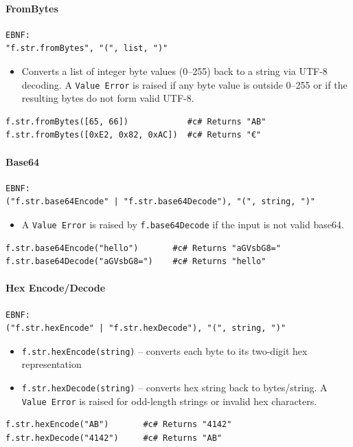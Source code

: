 \paragraph{FromBytes}
\begin{verbatim}
EBNF:
"f.str.fromBytes", "(", list, ")"
\end{verbatim}
\begin{itemize}
\item Converts a list of integer byte values (0--255) back to a string via UTF-8 decoding. A \texttt{Value Error} is raised if any byte value is outside 0--255 or if the resulting bytes do not form valid UTF-8.
\end{itemize}
\begin{verbatim}
f.str.fromBytes([65, 66])            #c# Returns "AB"
f.str.fromBytes([0xE2, 0x82, 0xAC])  #c# Returns "€"
\end{verbatim}

\paragraph{Base64}
\begin{verbatim}
EBNF:
("f.str.base64Encode" | "f.str.base64Decode"), "(", string, ")"
\end{verbatim}
\begin{itemize}
\item A \texttt{Value Error} is raised by \texttt{f.base64Decode} if the input is not valid base64.
\end{itemize}
\begin{verbatim}
f.str.base64Encode("hello")       #c# Returns "aGVsbG8="
f.str.base64Decode("aGVsbG8=")    #c# Returns "hello"
\end{verbatim}

\paragraph{Hex Encode/Decode}
\begin{verbatim}
EBNF:
("f.str.hexEncode" | "f.str.hexDecode"), "(", string, ")"
\end{verbatim}
\begin{itemize}
\item \texttt{f.str.hexEncode(string)} -- converts each byte to its two-digit hex representation
\item \texttt{f.str.hexDecode(string)} -- converts hex string back to bytes/string. A \texttt{Value Error} is raised for odd-length strings or invalid hex characters.
\end{itemize}
\begin{verbatim}
f.str.hexEncode("AB")       #c# Returns "4142"
f.str.hexDecode("4142")     #c# Returns "AB"
\end{verbatim}

